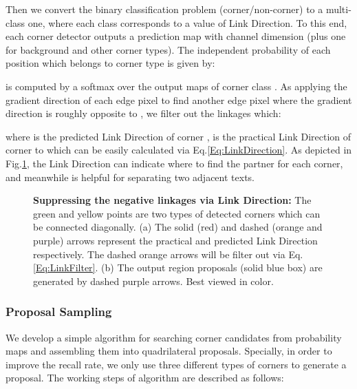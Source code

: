 \documentclass[3p, times]{elsarticle}
\begin{document}
\noindent Then we convert the binary classification problem (corner/non-corner) to a multi-class one, where each class corresponds to a value of Link Direction. To this end, each corner detector outputs a prediction map with channel dimension  (plus one for background and other corner types). The independent probability of each position which belongs to corner type  is given by:



\noindent  is computed by a softmax over the  output maps of corner class . As \cite{SWT2010CVPR} applying the gradient direction  of each edge pixel  to find another edge pixel  where the gradient direction  is roughly opposite to , we filter out the linkages which:



\noindent where  is the predicted Link Direction of corner ,  is the practical Link Direction of corner  to  which can be easily calculated via Eq.\ref{Eq:LinkDirection}. As depicted in Fig.\ref{Fig_2}, the Link Direction can indicate where to find the partner for each corner, and meanwhile is helpful for separating two adjacent texts.

\begin{figure}[!htb]
  \centering
  \hspace{-0.5ex}
  \caption{\textbf{Suppressing the negative linkages via Link Direction:} The green and yellow points are two types of detected corners which can be connected diagonally. (a) The solid (red) and dashed (orange and purple) arrows represent the practical and predicted Link Direction respectively. The dashed orange arrows will be filter out via Eq.\ref{Eq:LinkFilter}. (b) The output region proposals (solid blue box) are generated by dashed purple arrows. Best viewed in color.}
  \label{Fig_2} 
\end{figure}




\subsubsection{Proposal Sampling}
We develop a simple algorithm for searching corner candidates from probability maps and assembling them into quadrilateral proposals. Specially, in order to improve the recall rate, we only use three different types of corners to generate a proposal. The working steps of algorithm are described as follows:
\end{document}
